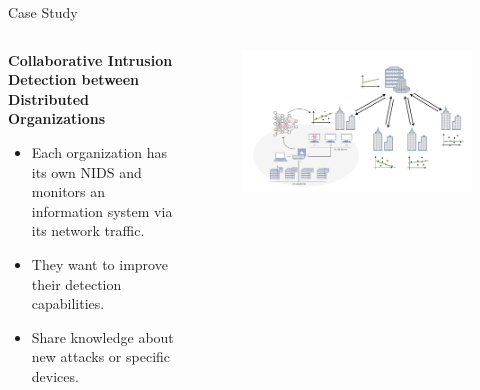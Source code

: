 \begin{frame}{Case Study}

  \begin{columns}
    \begin{column}{0.4\textwidth}
      \textbf{Collaborative Intrusion Detection between Distributed Organizations}
  \begin{itemize}
    \item Each organization has its own NIDS and monitors an information system via its network traffic.
    \item They want to improve their detection capabilities.
    \item Share knowledge about new attacks or specific devices.
  \end{itemize}
    \end{column}
    
    \begin{column}{0.6\textwidth}
      \begin{figure}
        \centering
        \includegraphics[width=\linewidth]{figures/intro/cids.drawio.pdf}
      \end{figure}
    \end{column}
  \end{columns}
\end{frame}



